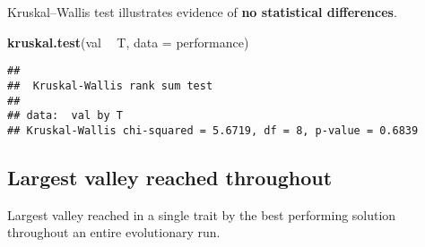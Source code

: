 \documentclass[]{book}
\newenvironment{Shaded}{\begin{snugshade}}{\end{snugshade}}
\newcommand{\DataTypeTok}[1]{\textcolor[rgb]{0.13,0.29,0.53}{#1}}
\newcommand{\KeywordTok}[1]{\textcolor[rgb]{0.13,0.29,0.53}{\textbf{#1}}}
\newcommand{\NormalTok}[1]{#1}
\newcommand{\OperatorTok}[1]{\textcolor[rgb]{0.81,0.36,0.00}{\textbf{#1}}}
\newcommand{\StringTok}[1]{\textcolor[rgb]{0.31,0.60,0.02}{#1}}
\begin{document}
Kruskal--Wallis test illustrates evidence of \textbf{no statistical differences}.

\begin{Shaded}
\begin{Highlighting}[]
\KeywordTok{kruskal.test}\NormalTok{(val }\OperatorTok{~}\StringTok{ }\NormalTok{T, }\DataTypeTok{data =}\NormalTok{ performance)}
\end{Highlighting}
\end{Shaded}

\begin{verbatim}
## 
##  Kruskal-Wallis rank sum test
## 
## data:  val by T
## Kruskal-Wallis chi-squared = 5.6719, df = 8, p-value = 0.6839
\end{verbatim}

\hypertarget{largest-valley-reached-throughout-3}{%
\subsection{Largest valley reached throughout}\label{largest-valley-reached-throughout-3}}

Largest valley reached in a single trait by the best performing solution throughout an entire evolutionary run.
\end{document}
